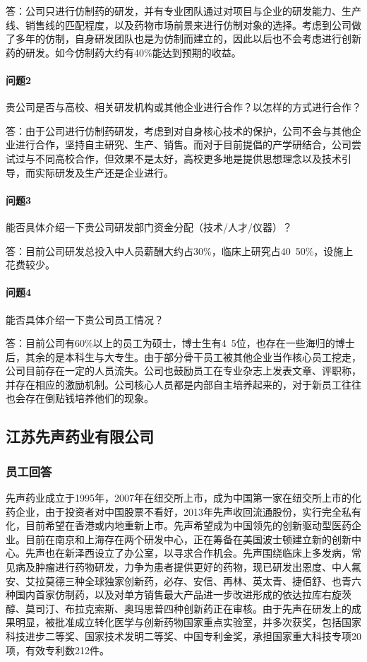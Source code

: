 \documentclass[twocolumn,openany]{ctexbook}
\begin{document}
	答：公司只进行仿制药的研发，并有专业团队通过对项目与企业的研发能力、生产线、销售线的匹配程度，以及药物市场前景来进行仿制对象的选择。考虑到公司做了多年的仿制，自身研发团队也是为仿制而建立的，因此以后也不会考虑进行创新药的研发。如今仿制药大约有40\%能达到预期的收益。
	
	\paragraph{问题2}贵公司是否与高校、相关研发机构或其他企业进行合作？以怎样的方式进行合作？
	
	答：由于公司进行仿制药研发，考虑到对自身核心技术的保护，公司不会与其他企业进行合作，坚持自主研究、生产、销售。而对于目前提倡的产学研结合，公司尝试过与不同高校合作，但效果不是太好，高校更多地是提供思想理念以及技术引导，而实际研发及生产还是企业进行。
	
	\paragraph{问题3}能否具体介绍一下贵公司研发部门资金分配（技术/人才/仪器）？
	
	答：目前公司研发总投入中人员薪酬大约占30\%，临床上研究占40~50\%，设施上花费较少。
	
	\paragraph{问题4}能否具体介绍一下贵公司员工情况？
	
	答：目前公司有60\%以上的员工为硕士，博士生有4~5位，也存在一些海归的博士后，其余的是本科生与大专生。由于部分骨干员工被其他企业当作核心员工挖走，公司目前存在一定的人员流失。公司也鼓励员工在专业杂志上发表文章、评职称，并存在相应的激励机制。公司核心人员都是内部自主培养起来的，对于新员工往往也会存在倒贴钱培养他们的现象。

	\subsection*{江苏先声药业有限公司}
	\subsubsection*{员工回答}先声药业成立于1995年，2007年在纽交所上市，成为中国第一家在纽交所上市的化药企业，由于投资者对中国股票不看好，2013年先声收回流通股份，实行完全私有化，目前希望在香港或内地重新上市。先声希望成为中国领先的创新驱动型医药企业。目前在南京和上海存在两个研发中心，正在筹备在美国波士顿建立新的创新中心。先声也在新泽西设立了办公室，以寻求合作机会。先声围绕临床上多发病，常见病及肿瘤进行药物研发，力争为患者提供更好的药物，现已研发出恩度、中人氟安、艾拉莫德三种全球独家创新药，必存、安信、再林、英太青、捷佰舒、也青六种国内首家仿制药，以及对单方销售最大产品进一步改进形成的依达拉库右旋茨醇、莫司汀、布拉克索斯、奥玛思普四种创新药正在审核。由于先声在研发上的成果明显，被批准成立转化医学与创新药物国家重点实验室，并多次获奖，包括国家科技进步二等奖、国家技术发明二等奖、中国专利金奖，承担国家重大科技专项20项，有效专利数212件。
	
\end{document}
